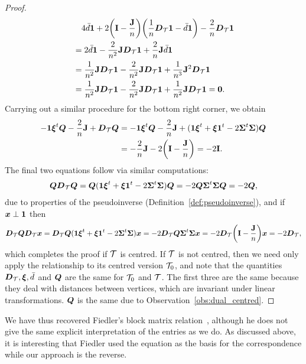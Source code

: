 \begin{proof}
\begin{align*}
	&\quad  4\bar{d}\vb{1} +2\bigg(\vb{I}-\frac{\vb{J}}{n}\bigg)\bigg(\frac{1}{n}\vb*{D}_{\mathcal{T}}\vb{1}-\bar{d}\vb{1}\bigg)  -\frac{2}{n}\vb*{D}_{\mathcal{T}}\vb{1} \\
	&= 2\bar{d}\vb{1} -  \frac{2}{n^2}\vb{J}\vb*{D}_{\mathcal{T}}\vb{1} + \frac{2}{n}\vb{J}\bar{d}\vb{1} \\
	&=\frac{1}{n^2}\vb{J}\vb*{D}_{\mathcal{T}}\vb{1} -  \frac{2}{n^2}\vb{J}\vb*{D}_{\mathcal{T}}\vb{1} + \frac{1}{n^3}\vb{J}^2\vb*{D}_{\mathcal{T}}\vb{1} \\
	&= \frac{1}{n^2}\vb{J}\vb*{D}_{\mathcal{T}}\vb{1} -  \frac{2}{n^2}\vb{J}\vb*{D}_{\mathcal{T}}\vb{1} + \frac{1}{n^2}\vb{J}\vb*{D}_{\mathcal{T}}\vb{1}=\vb{0}.
	\end{align*}
	Carrying out a similar  procedure for  the  bottom right corner, we  obtain  
	\begin{align*}
	-\vb{1}\vb*{\xi}^t\vb*{Q}-\frac{2}{n}\vb{J}+\vb*{D}_{\mathcal{T}}\vb*{Q} &= -\vb{1}\vb*{\xi}^t\vb*{Q}-\frac{2}{n}\vb{J}  + (\vb{1}\vb*{\xi}^t+\vb*{\xi}\vb{1}^t -2\boldsymbol{\Sigma}^t\boldsymbol{\Sigma})\vb*{Q} \\
	&= -\frac{2}{n}\vb{J}-2\bigg(\vb{I}-\frac{\vb{J}}{n}\bigg) = -2\vb{I}.
	\end{align*}
	The  final two equations follow via similar computations: 
	\begin{align*}
	\vb*{Q}\vb*{D}_{\mathcal{T}}\vb*{Q} = \vb*{Q}(\vb{1}\vb*{\xi}^t+\vb*{\xi}\vb{1}^t-2\boldsymbol{\Sigma}^t\boldsymbol{\Sigma})\vb*{Q} = -2\vb*{Q}\boldsymbol{\Sigma}^t\boldsymbol{\Sigma}\vb*{Q} = -2\vb*{Q},
	\end{align*}
	due to properties of the pseudoinverse (Definition~\ref{def:pseudoinverse}), and if $\vb*{x}\perp\vb{1}$ then 
	\begin{align*}
	\vb*{D}_{\mathcal{T}} \vb*{Q}\vb*{D}_{\mathcal{T}} \vb*{x} = \vb*{D}_{\mathcal{T}} \vb*{Q}(\vb{1}\vb*{\xi}^t  +\vb*{\xi}\vb{1}^t - 2\boldsymbol{\Sigma}^t\boldsymbol{\Sigma})\vb*{x} = -2\vb*{D}_{\mathcal{T}}\vb*{Q} \boldsymbol{\Sigma}^t\boldsymbol{\Sigma}\vb*{x} = -2\vb*{D}_{\mathcal{T}}\bigg(\vb{I}-\frac{\vb{J}}{n}\bigg) \vb*{x} = -2\vb*{D}_{\mathcal{T}},
	\end{align*}
	which completes the proof if $\mathcal{T}$ is centred. If $\mathcal{T}$  is not centred, then we need only apply the relationship to its centred  version $\mathcal{T}_0$, and note  that the quantities $\vb*{D}_{\mathcal{T}}, \vb*{\xi},\bar{d}$ and $\vb*{Q}$ are the same for $\mathcal{T}_0$ and $\mathcal{T}$. The first three are the same because they deal with distances between vertices, which are invariant under linear transformations. $\vb*{Q}$ is the  same due to  Observation~\ref{obs:dual_centred}. 
\end{proof}

\begin{remark}
	We have thus recovered Fiedler's block matrix relation~\cite{fiedler1993geometric}, although he does not give the same explicit   interpretation of  the entries as we do. As discussed above, it is interesting that Fiedler used the equation  as the basis for the correspondence while our approach is the reverse. 
\end{remark}

